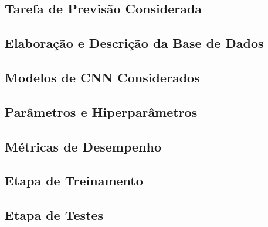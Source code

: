 
\subsection{Tarefa de Previsão Considerada}



\subsection{Elaboração e Descrição da Base de Dados}



\subsection{Modelos de CNN Considerados}
\subsection{Parâmetros e Hiperparâmetros}

\subsection{Métricas de Desempenho}


\subsection{Etapa de Treinamento}

\subsection{Etapa de Testes}
